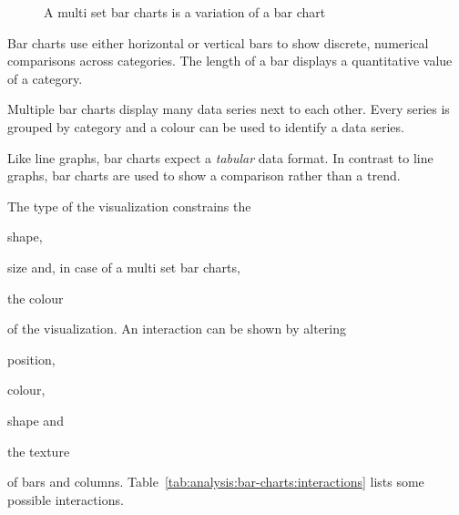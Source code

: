 \begin{figure}
  \caption{A multi set bar charts is a variation of a bar chart}
  \label{fig:analysis:bar-charts}
  \begin{center}
    \qquad
  \end{center}
\end{figure}

Bar charts use either horizontal or vertical bars to show discrete, numerical comparisons across categories.
The length of a bar displays a quantitative value of a category.

Multiple bar charts display many data series next to each other.
Every series is grouped by category and a colour can be used to identify a data series.

Like line graphs, bar charts expect a \emph{tabular} data format.
In contrast to line graphs, bar charts are used to show a comparison rather than a trend.

The type of the visualization constrains the
\begin{enumerate*}[label=(\arabic*)]
    \item shape,
    \item size and, in case of a multi set bar charts,
    \item the colour
\end{enumerate*}
of the visualization.
An interaction can be shown by altering
\begin{enumerate*}[label=(\arabic*)]
    \item position,
    \item colour,
    \item shape and
    \item the texture
\end{enumerate*}
of bars and columns.
Table~\ref{tab:analysis:bar-charts:interactions} lists some possible interactions.


